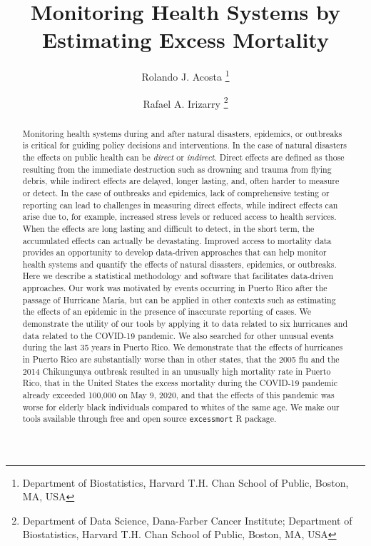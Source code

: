\documentclass[11pt]{article}
\begin{document}
\title{Monitoring Health Systems by Estimating Excess Mortality}
 
\author{
{Rolando J. Acosta \footnote{Department of Biostatistics, Harvard T.H. Chan School of Public, Boston, MA, USA}} \and {Rafael A. Irizarry \footnote{Department of Data Science, Dana-Farber Cancer Institute; \newline Department of Biostatistics, Harvard T.H. Chan School of Public, Boston, MA, USA}}
}

\maketitle
\setcounter{page}{0}

\begin{abstract}
Monitoring health systems during and after natural disasters, epidemics, or outbreaks is critical for guiding policy decisions and interventions. In the case of natural disasters the effects on public health can be \textit{direct} or \textit{indirect}. Direct effects are defined as those resulting from the immediate destruction such as drowning and trauma from flying debris, while indirect effects are delayed, longer lasting, and, often harder to measure or detect. In the case of outbreaks and epidemics, lack of comprehensive testing or reporting can lead to challenges in measuring direct effects, while indirect effects can arise due to, for example, increased stress levels or reduced access to health services. When the effects are long lasting and difficult to detect, in the short term, the accumulated effects can actually be devastating. Improved access to mortality data provides an opportunity to develop data-driven approaches that can help monitor health systems and quantify the effects of natural disasters, epidemics, or outbreaks. Here we describe a statistical methodology and software that facilitates data-driven approaches. Our work was motivated by events occurring in Puerto Rico after the passage of Hurricane Mar\'ia, but can be applied in other contexts such as estimating the effects of an epidemic in the presence of inaccurate reporting of cases. We demonstrate the utility of our tools by applying it to data related to six hurricanes and data related to the COVID-19 pandemic. We also searched for other unusual events during the last 35 years in Puerto Rico. We demonstrate that the effects of hurricanes in Puerto Rico are substantially worse than in other states, that the 2005 flu and the 2014 Chikungunya outbreak resulted in an unusually high mortality rate in Puerto Rico, that in the United States the excess mortality during the COVID-19 pandemic already exceeded 100,000 on May 9, 2020, and that the effects of this pandemic was worse for elderly black individuals compared to whites of the same age. We make our tools available through free and open source \verb+excessmort+ R package.
\end{abstract}
\end{document}
